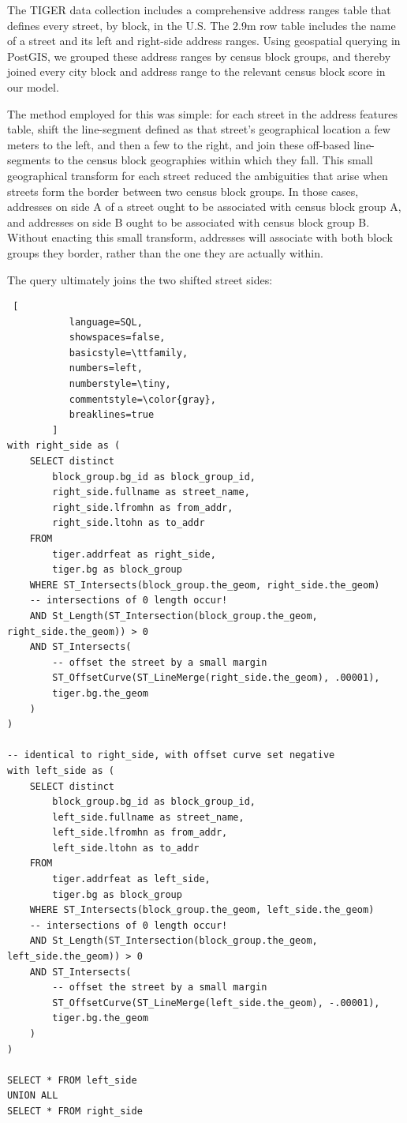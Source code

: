 \documentclass{sig-alternate}
\begin{document}
The TIGER data collection includes a comprehensive address ranges table that defines every street, by block, in the U.S. The 2.9m row table includes the name of a street and its left and right-side address ranges. Using geospatial querying in PostGIS, we grouped these address ranges by census block groups, and thereby joined every city block and address range to the relevant census block score in our model. 

The method employed for this was simple: for each street in the address features table, shift the line-segment defined as that street's geographical location a few meters to the left, and then a few to the right, and join these off-based line-segments to the census block geographies within which they fall. This small geographical transform for each street reduced the ambiguities that arise when streets form the border between two census block groups. In those cases, addresses on side A of a street ought to be associated with census block group A, and addresses on side B ought to be associated with census block group B. Without enacting this small transform, addresses will associate with both block groups they border, rather than the one they are actually within.

The query ultimately joins the two shifted street sides:

\begin{lstlisting} [
           language=SQL,
           showspaces=false,
           basicstyle=\ttfamily,
           numbers=left,
           numberstyle=\tiny,
           commentstyle=\color{gray},
           breaklines=true
        ]
with right_side as (
    SELECT distinct
        block_group.bg_id as block_group_id,
        right_side.fullname as street_name,
        right_side.lfromhn as from_addr,
        right_side.ltohn as to_addr
    FROM
        tiger.addrfeat as right_side,
        tiger.bg as block_group
    WHERE ST_Intersects(block_group.the_geom, right_side.the_geom)
    -- intersections of 0 length occur!
    AND St_Length(ST_Intersection(block_group.the_geom, right_side.the_geom)) > 0
    AND ST_Intersects(
        -- offset the street by a small margin
        ST_OffsetCurve(ST_LineMerge(right_side.the_geom), .00001),
        tiger.bg.the_geom
    )
)

-- identical to right_side, with offset curve set negative
with left_side as (
    SELECT distinct
        block_group.bg_id as block_group_id,
        left_side.fullname as street_name,
        left_side.lfromhn as from_addr,
        left_side.ltohn as to_addr
    FROM
        tiger.addrfeat as left_side,
        tiger.bg as block_group
    WHERE ST_Intersects(block_group.the_geom, left_side.the_geom)
    -- intersections of 0 length occur!
    AND St_Length(ST_Intersection(block_group.the_geom, left_side.the_geom)) > 0
    AND ST_Intersects(
        -- offset the street by a small margin
        ST_OffsetCurve(ST_LineMerge(left_side.the_geom), -.00001),
        tiger.bg.the_geom
    )
)

SELECT * FROM left_side
UNION ALL
SELECT * FROM right_side
\end{lstlisting}
\end{document}
